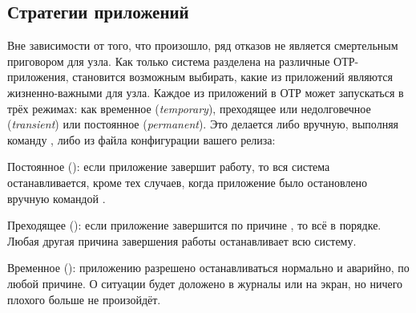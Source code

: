 \subsection{Стратегии приложений}
\label{subsec:start-link-application-strategies}

\sloppy{}
Вне зависимости от того, что произошло, ряд отказов не является смертельным приговором для узла. Как только система разделена на различные ОТР-приложения, становится возможным выбирать, какие из приложений являются жизненно-важными для узла. Каждое из приложений в ОТР может запускаться в трёх режимах: как временное (\emph{temporary}), преходящее или недолговечное (\emph{transient}) или постоянное (\emph{permanent}). Это делается либо вручную, выполняя команду , либо из файла конфигурации вашего релиза:

\begin{itemize*}
	\item Постоянное (): если приложение завершит работу, то вся система останавливается, кроме тех случаев, когда приложение было остановлено вручную командой .
	\item Преходящее (): если приложение завершится по причине , то всё в порядке. Любая другая причина завершения работы останавливает всю систему.
	\item Временное (): приложению разрешено останавливаться нормально и аварийно, по любой причине. О ситуации будет доложено в журналы или на экран, но ничего плохого больше не произойдёт.
\end{itemize*}

